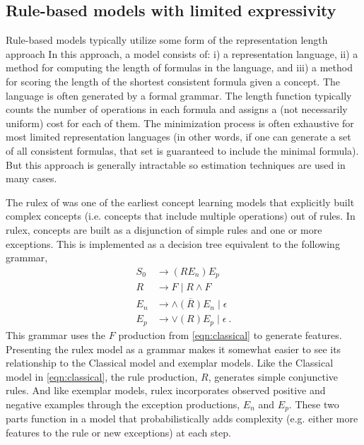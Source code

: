 \documentclass[doc,floatsintext]{apa6}
\begin{document}

\subsection{Rule-based models with limited expressivity}



Rule-based models typically utilize some form of the representation length approach \citep{feldman2000,kemp2012,goodwinj2011}
In this approach, a model consists of: i) a representation language, ii) a method for computing the length of formulas in the language, and iii) a method for scoring the length of the shortest consistent formula given a concept.
The language is often generated by a formal grammar.
The length function typically counts the number of operations in each formula and assigns a (not necessarily uniform) cost for each of them.
The minimization process is often exhaustive for most limited representation languages (in other words, if one can generate a set of all consistent formulas, that set is guaranteed to include the minimal formula).
But this approach is generally intractable so estimation techniques are used in many cases.

The \ac{rulex} of \citet{nosofskypm1994} was one of the earliest concept learning models that explicitly built complex concepts (i.e. concepts that include multiple operations) out of rules.
In \ac{rulex}, concepts are built as a disjunction of simple rules and one or more exceptions.
This is implemented as a decision tree equivalent to the following grammar,
%
\begin{align} \label{eqn:rulex}
  S_0 &\rightarrow \left( R E_n \right) E_p \\
  R &\rightarrow F \mid R \wedge F \nonumber \\
  E_n &\rightarrow \wedge \overline{(R)} E_n \mid \epsilon \nonumber \\
  E_p &\rightarrow \vee (R) E_p \mid \epsilon ~. \nonumber
\end{align}
This grammar uses the $F$ production from \cref{eqn:classical} to generate features.
Presenting the \ac{rulex} model as a grammar makes it somewhat easier to see its relationship to the Classical model and exemplar models. Like the Classical model in \cref{eqn:classical}, the rule production, $R$, generates simple conjunctive rules. And like exemplar models, \ac{rulex} incorporates observed positive and negative examples through the exception productions, $E_n$ and $E_p$. These two parts function in a model that probabilistically adds complexity (e.g. either more features to the rule or new exceptions) at each step.
\end{document}
